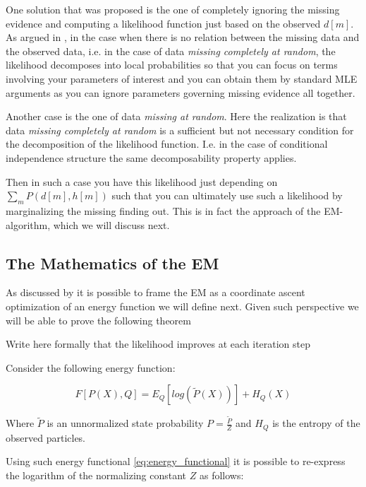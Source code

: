 \documentclass[11pt]{article}
\begin{document}
\begin{article}
One solution that was proposed is the one of completely ignoring
the missing evidence and computing a likelihood function just based
on the observed \(d[m]\). As argued in \cite{koller2009probabilistic},
in the case when there is no relation between the missing data and
the observed data, i.e. in the case of data \emph{missing completely at
random}, the likelihood decomposes into local probabilities so that
you can focus on terms involving your parameters of interest and
you can obtain them by standard MLE arguments as you can ignore
parameters governing missing evidence all together.

Another case is the one of data \emph{missing at random}. Here the
realization is that data \emph{missing completely at random} is a
sufficient but not necessary condition for the decomposition of the
likelihood function. I.e. in the case of conditional independence
structure the same decomposability property applies.

Then in such a case you have this likelihood just depending on
\(\sum_m P(d[m], h[m])\) such that you can ultimately use such a
likelihood by marginalizing the missing finding out. This is in
fact the approach of the EM-algorithm, which we will discuss next.


\subsection{The Mathematics of the EM}
\label{math_em}
As discussed by \cite{koller2009probabilistic} it is possible to frame
the EM as a coordinate ascent optimization of an energy function we
will define next. Given such perspective we will be able to prove the
following theorem

\begin{theorem}\label{thm:one}
Write here formally that the likelihood improves at each iteration step
\end{theorem}

Consider the following energy function:

\begin{equation} \label{eq:energy_functional}
F[P(X), Q] = E_Q[log (\tilde{P}(X))] + H_Q (X)
\end{equation}

Where \(\tilde{P}\) is an unnormalized state probability \(P =
   \frac{\tilde{P}}{Z}\) and \(H_Q\) is the entropy of the observed
particles. 

Using such energy functional \ref{eq:energy_functional} it is possible
to re-express the logarithm of the normalizing constant \(Z\) as
follows:


\end{article}
\end{document}
